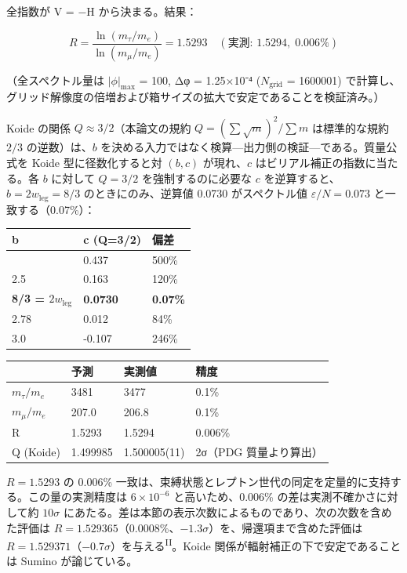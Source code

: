 \documentclass[fontsize=11pt,paper=a4,lualatex]{jlreq}
\newcommand{\PII}{\textsuperscript{\textup{II}}}
\begin{document}
全指数が V = −H から決まる。結果：

\[R = \frac{\ln(m_\tau/m_e)}{\ln(m_\mu/m_e)} = 1.5293 \quad (\text{実測: } 1.5294,\; 0.006\%)\]

（全スペクトル量は $|\phi|_{\mathrm{max}}$ = 100, Δφ = 1.25×10⁻⁴ ($N_{\mathrm{grid}}$ =
1600001) で計算し、グリッド解像度の倍増および箱サイズの拡大で安定であることを検証済み。）

Koide \cite{koide} の関係 $Q \approx 3/2$（本論文の規約 $Q = (\sum\sqrt{m})^2/\sum m$ は標準的な規約 $2/3$ の逆数）は、$b$ を決める入力ではなく検算---出力側の検証---である。質量公式を Koide 型に径数化すると対 $(b, c)$ が現れ、$c$ はビリアル補正の指数に当たる。各 $b$ に対して $Q = 3/2$ を強制するのに必要な $c$ を逆算すると、$b = 2w_\mathrm{leg} = 8/3$ のときにのみ、逆算値 0.0730 がスペクトル値 $\varepsilon/N = 0.073$ と一致する（0.07\%）：

\begin{longtable}[]{@{}lll@{}}
\toprule\noalign{}
b & c (Q=3/2) & 偏差 \\
\midrule\noalign{}
\endhead
\bottomrule\noalign{}
\endlastfoot
2.0 & 0.437 & 500\% \\
2.5 & 0.163 & 120\% \\
\textbf{8/3 = $2w_\mathrm{leg}$} & \textbf{0.0730} & \textbf{0.07\%} \\
2.78 & 0.012 & 84\% \\
3.0 & -0.107 & 246\% \\
\end{longtable}

\begin{longtable}[]{@{}llll@{}}
\toprule\noalign{}
& 予測 & 実測値 & 精度 \\
\midrule\noalign{}
\endhead
\bottomrule\noalign{}
\endlastfoot
$m_\tau/m_e$ & 3481 & 3477 & 0.1\% \\
$m_\mu/m_e$ & 207.0 & 206.8 & 0.1\% \\
R & 1.5293 & 1.5294 & 0.006\% \\
Q (Koide) & 1.499985 & 1.500005(11) & 2σ（PDG 質量より算出） \\
\end{longtable}

$R = 1.5293$ の 0.006\% 一致は、束縛状態とレプトン世代の同定を定量的に支持する。この量の実測精度は $6 \times 10^{-6}$ と高いため、0.006\% の差は実測不確かさに対して約 $10\sigma$ にあたる。差は本節の表示次数によるものであり、次の次数を含めた評価は $R = 1.529365$（0.0008\%、$-1.3\sigma$）を、帰還項まで含めた評価は $R = 1.529371$（$-0.7\sigma$）を与える\PII{}。Koide 関係が輻射補正の下で安定であることは Sumino \cite{sumino} が論じている。
\end{document}
